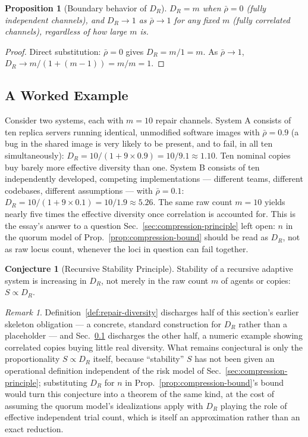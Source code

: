\documentclass[12pt,a4paper]{article}
\theoremstyle{plain}
\newtheorem{proposition}[theorem]{Proposition}
\theoremstyle{definition}
\newtheorem{conjecture}[theorem]{Conjecture}
\theoremstyle{remark}
\newtheorem{remark}[theorem]{Remark}
\newcommand{\DR}{D_R}
\begin{document}
\begin{proposition}[Boundary behavior of $\DR$]
\label{prop:dr-boundary}
$\DR = m$ when $\bar\rho = 0$ (fully independent channels), and $\DR \to 1$ as $\bar\rho \to 1$ for any fixed $m$ (fully correlated channels), regardless of how large $m$ is.
\end{proposition}

\begin{proof}
Direct substitution: $\bar\rho=0$ gives $\DR = m/1 = m$. As $\bar\rho \to 1$, $\DR \to m/(1+(m-1)) = m/m = 1$.
\end{proof}

\subsection{A Worked Example}
\label{subsec:dr-worked-example}

Consider two systems, each with $m=10$ repair channels. System A consists of ten replica servers running identical, unmodified software images with $\bar\rho = 0.9$ (a bug in the shared image is very likely to be present, and to fail, in all ten simultaneously): $\DR = 10/(1+9\times0.9) = 10/9.1 \approx 1.10$. Ten nominal copies buy barely more effective diversity than one. System B consists of ten independently developed, competing implementations — different teams, different codebases, different assumptions — with $\bar\rho = 0.1$: $\DR = 10/(1+9\times0.1) = 10/1.9 \approx 5.26$. The same raw count $m=10$ yields nearly five times the effective diversity once correlation is accounted for. This is the essay's answer to a question Sec.~\ref{sec:compression-principle} left open: $n$ in the quorum model of Prop.~\ref{prop:compression-bound} should be read as $\DR$, not as raw locus count, whenever the loci in question can fail together.

\begin{conjecture}[Recursive Stability Principle]
\label{conj:stability}
Stability of a recursive adaptive system is increasing in $\DR$, not merely in the raw count $m$ of agents or copies: $S \propto \DR$.
\end{conjecture}

\begin{remark}
Definition~\ref{def:repair-diversity} discharges half of this section's earlier skeleton obligation — a concrete, standard construction for $\DR$ rather than a placeholder — and Sec.~\ref{subsec:dr-worked-example} discharges the other half, a numeric example showing correlated copies buying little real diversity. What remains conjectural is only the proportionality $S \propto \DR$ itself, because ``stability'' $S$ has not been given an operational definition independent of the risk model of Sec.~\ref{sec:compression-principle}; substituting $\DR$ for $n$ in Prop.~\ref{prop:compression-bound}'s bound would turn this conjecture into a theorem of the same kind, at the cost of assuming the quorum model's idealizations apply with $\DR$ playing the role of effective independent trial count, which is itself an approximation rather than an exact reduction.
\end{remark}
\end{document}
